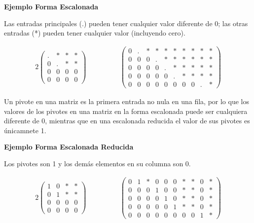 \documentclass{article}
\begin{document}
\begin{large}
    \textbf{Ejemplo Forma Escalonada}
\end{large}

Las entradas principales (.) pueden tener cualquier valor diferente de 0; las otras entradas (*) pueden tener cualquier valor (incluyendo cero).

\begin{alignat*}{2}
    \begin{pmatrix}
        .&*&*&*\\
        0&.&*&*\\
        0&0&0&0\\
        0&0&0&0
    \end{pmatrix}
    & \hspace{ 4em}%
    \begin{pmatrix}
        0&.&*&*&*&*&*&*&*&*\\
        0&0&0&.&*&*&*&*&*&*\\
        0&0&0&0&.&*&*&*&*&*\\
        0&0&0&0&0&.&*&*&*&*\\
        0&0&0&0&0&0&0&0&.&*
    \end{pmatrix}
\end{alignat*}

\begin{tcolorbox}[colback=green!20!white,colframe=green!80!black,title=Pivote]
    Un pivote en una matriz es la primera entrada no nula en una fila, por lo que los valores de los pivotes en una matriz en la forma escalonada puede ser cualquiera diferente de 0, mientras que en una escalonada reducida el valor de sus pivotes es únicamnete 1.
\end{tcolorbox}

\begin{large}
    \textbf{Ejemplo Forma Escalonada Reducida}
\end{large}

Los pivotes son 1 y los demás elementos en su columna son 0.

\begin{alignat*}{2}
    \begin{pmatrix}
        1&0&*&*\\
        0&1&*&*\\
        0&0&0&0\\
        0&0&0&0
    \end{pmatrix}
    & \hspace{ 4em}%
    \begin{pmatrix}
        0&1&*&0&0&0&*&*&0&*\\
        0&0&0&1&0&0&*&*&0&*\\
        0&0&0&0&1&0&*&*&0&*\\
        0&0&0&0&0&1&*&*&0&*\\
        0&0&0&0&0&0&0&0&1&*
    \end{pmatrix}
\end{alignat*}
\end{document}
